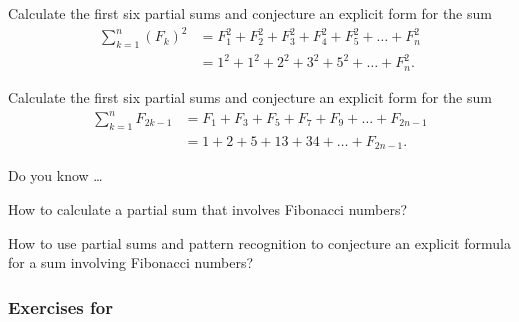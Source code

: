 \begin{exer}[\exerU] %
\label{exer_sum_firstn_Fib_sq_conj}
    Calculate the first six partial sums and conjecture an explicit form for the sum
            \begin{align*}
                \sum_{k=1}^n(F_k)^2
                & = F_1^2+F_2^2+F_3^2+F_4^2+F_5^2+\ldots+F_n^2 \\
                & = 1^2+1^2+2^2+3^2+5^2+\ldots + F_n^2.
            \end{align*}  
\end{exer}

\begin{exer}[\exerU] %
\label{exer_fib_sum_odd_terms_conj} 
    Calculate the first six partial sums and conjecture an explicit form for the sum
            \begin{align*}
                \sum_{k=1}^{n}F_{2k-1}
                & = F_1+F_3 +F_5 +F_7+F_9+ \ldots + F_{2n-1} \\
                & = 1+2+5+13+34+\ldots + F_{2n-1}.
            \end{align*}
\end{exer}

\begin{exer}[\exerR] %
\label{exer_dyk_fib_sums}
    Do you know \ldots
        \begin{exerpart}
            \item How to calculate a partial sum that involves Fibonacci numbers?
            \item How to use partial sums and pattern recognition to conjecture an explicit formula for a sum involving Fibonacci numbers? 
        \end{exerpart}
\end{exer}


\subsubsection*{Exercises for  \subfactorpolys}

